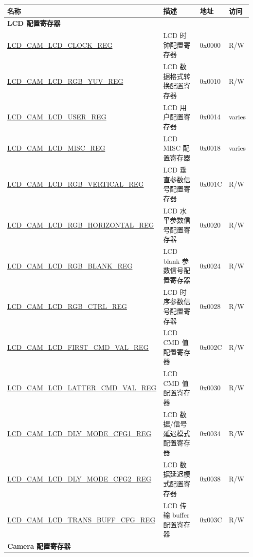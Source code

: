 \begin{longtable}{ | p{6.4cm} | p{6.8cm} | p{1.3cm} | p{1cm} | }
\hline\rowcolor{lightgray}
\textbf{名称} & \textbf{描述} &  \textbf{地址} & \textbf{访问}  \\ \hline
\endhead
\multicolumn{4}{|l|}{\textbf{LCD 配置寄存器}} \\ \hline
\hyperref[regdesc:LCDCAMLCDCLOCKREG]{LCD\_CAM\_LCD\_CLOCK\_REG} & LCD 时钟配置寄存器 & 0x0000 & R/W \\ \hline
\hyperref[regdesc:LCDCAMLCDRGBYUVREG]{LCD\_CAM\_LCD\_RGB\_YUV\_REG} & LCD 数据格式转换配置寄存器 & 0x0010 & R/W \\ \hline
\hyperref[regdesc:LCDCAMLCDUSERREG]{LCD\_CAM\_LCD\_USER\_REG} & LCD 用户配置寄存器 & 0x0014 & varies \\ \hline
\hyperref[regdesc:LCDCAMLCDMISCREG]{LCD\_CAM\_LCD\_MISC\_REG} & LCD MISC 配置寄存器 & 0x0018 & varies \\ \hline
\hyperref[regdesc:LCDCAMLCDRGBVERTICALREG]{LCD\_CAM\_LCD\_RGB\_VERTICAL\_REG} & LCD 垂直参数信号配置寄存器 & 0x001C & R/W \\ \hline
\hyperref[regdesc:LCDCAMLCDRGBHORIZONTALREG]{LCD\_CAM\_LCD\_RGB\_HORIZONTAL\_REG} & LCD 水平参数信号配置寄存器 & 0x0020 & R/W \\ \hline
\hyperref[regdesc:LCDCAMLCDRGBBLANKREG]{LCD\_CAM\_LCD\_RGB\_BLANK\_REG} & LCD blank 参数信号配置寄存器 & 0x0024 & R/W \\ \hline
\hyperref[regdesc:LCDCAMLCDRGBCTRLREG]{LCD\_CAM\_LCD\_RGB\_CTRL\_REG} & LCD 时序参数信号配置寄存器 & 0x0028 & R/W \\ \hline
\hyperref[regdesc:LCDCAMLCDFIRSTCMDVALREG]{LCD\_CAM\_LCD\_FIRST\_CMD\_VAL\_REG} & LCD CMD 值配置寄存器 & 0x002C & R/W \\ \hline
\hyperref[regdesc:LCDCAMLCDLATTERCMDVALREG]{LCD\_CAM\_LCD\_LATTER\_CMD\_VAL\_REG} & LCD CMD 值配置寄存器 & 0x0030 & R/W \\ \hline
\hyperref[regdesc:LCDCAMLCDDLYMODECFG1REG]{LCD\_CAM\_LCD\_DLY\_MODE\_CFG1\_REG} & LCD 数据/信号延迟模式配置寄存器 & 0x0034 & R/W \\ \hline
\hyperref[regdesc:LCDCAMLCDDLYMODECFG2REG]{LCD\_CAM\_LCD\_DLY\_MODE\_CFG2\_REG} & LCD 数据延迟模式配置寄存器 & 0x0038 & R/W \\ \hline
\hyperref[regdesc:LCDCAMLCDTRANSBUFFCFGREG]{LCD\_CAM\_LCD\_TRANS\_BUFF\_CFG\_REG} & LCD 传输 buffer 配置寄存器 & 0x003C & R/W \\ \hline
\multicolumn{4}{|l|}{\textbf{Camera 配置寄存器}} \\ \hline

\end{longtable}
